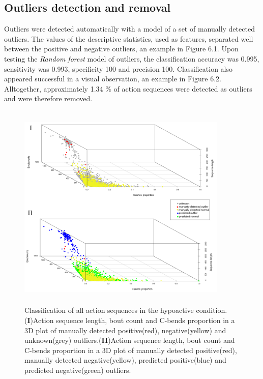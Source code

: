 \documentclass[a4paper,12pt]{article}
\begin{document}
\subsection{Outliers detection and removal}
Outliers were detected automatically with a model of a set of manually detected outliers.
The values of the descriptive statistics, used as features, separated well between the positive and negative outliers, an example in Figure 6.1.
Upon testing the \textit{Random forest} model of outliers, the classification accuracy was 0.995, sensitivity was 0.993, specificity 100 and precision 100. Classification also appeared successful in a visual observation, an example in Figure 6.2. Alltogether, approximately 1.34 \% of action sequences were detected as outliers and were therefore removed.
\begin{figure}[h!]
\begin{center}
\includegraphics[width=10cm,height=10cm]{outliersEx.png}
\caption{Classification of all action sequences in the hypoactive condition.(\textbf{I})Action sequence length, bout count and C-bends proportion in a 3D plot of manually detected positive(red), negative(yellow) and unknown(grey) outliers.(\textbf{II})Action sequence length, bout count and C-bends proportion in a 3D plot of manually detected positive(red), manually detected negative(yellow), predicted positive(blue) and predicted negative(green) outliers.}
\end{center}
\end{figure}
\newpage
\end{document}
